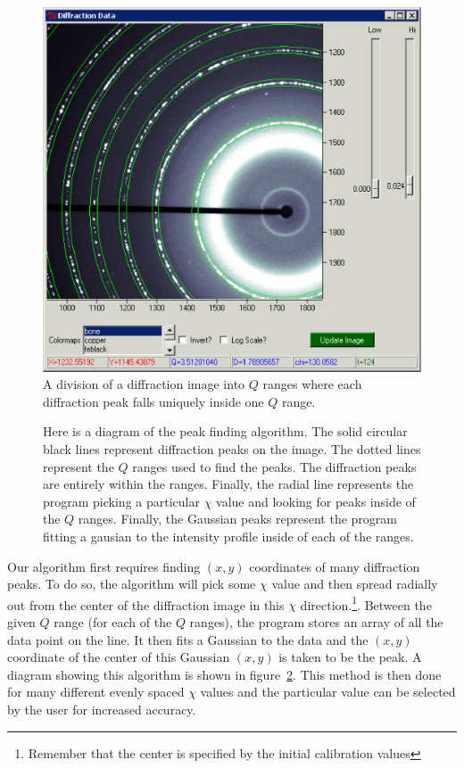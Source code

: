 \begin{figure}
    \centering
    \includegraphics[scale=.75]{figures/constant_dq_lines_on_diffraction_image.eps}
    \caption{A division of a diffraction image into
    $Q$ ranges where each diffraction peak falls 
    uniquely inside one $Q$ range.}
    \label{divide_up_image}
\end{figure}

\begin{figure}
\centering

\caption{Here is a diagram of the peak finding algorithm. 
The solid circular black lines represent diffraction
peaks on the image. The dotted lines represent the
$Q$ ranges used to find the peaks. The diffraction
peaks are entirely within the ranges. Finally, the radial
line represents the program picking a particular $\chi$
value and looking for peaks inside of the $Q$ ranges.
Finally, the Gaussian peaks represent the program fitting
a gausian to the intensity profile inside of each of the
ranges.}
\label{fitting}
\end{figure}

Our algorithm first requires
finding $(x,y)$ coordinates 
of many diffraction peaks. To do so, the algorithm will 
pick some $\chi$ value and then 
spread radially out from the center of the diffraction
image in this $\chi$ direction.\footnote{Remember
that the center is specified by the initial calibration 
values}. Between the given $Q$ range (for each of the $Q$ 
ranges), the program stores an array of all the data point 
on the line. It then fits a Gaussian to the data and the
$(x,y)$ coordinate of the center of this Gaussian $(x,y)$ 
is taken to be the peak. A diagram showing this algorithm
is shown in figure~\ref{fitting}. This method is
then done for many different evenly spaced $\chi$ values
and the particular value can be selected by the user
for increased accuracy.


